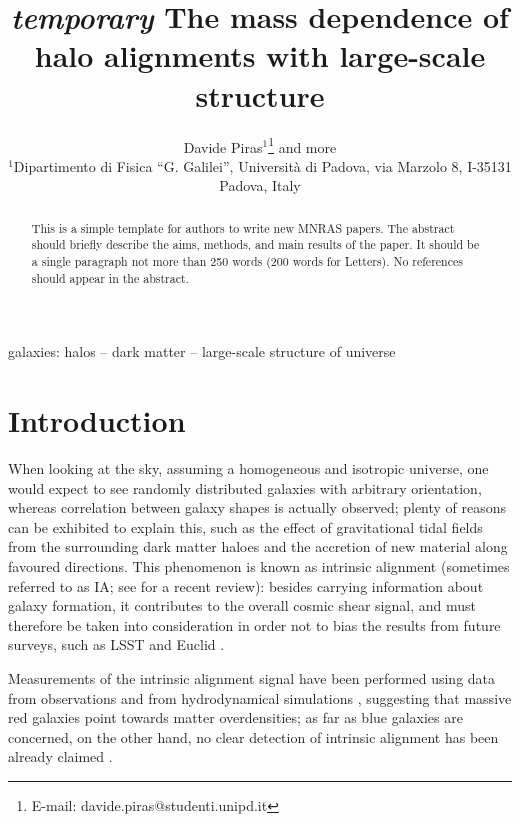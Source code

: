 \documentclass[a4paper,fleqn,usenatbib]{mnras}
\title[\textit{temporary} Slope of intrinsic alignment amplitude vs mass]{\textit{temporary} The mass dependence of halo alignments with large-scale structure}
\author[D. Piras and more]{
Davide Piras$^{1}$\thanks{E-mail: davide.piras@studenti.unipd.it}
and more
\\
$^{1}$Dipartimento di Fisica ``G. Galilei'', Universit\`{a} di Padova, via Marzolo 8, I-35131 Padova, Italy\\
}
\begin{document}
\label{firstpage}
\pagerange{\pageref{firstpage}--\pageref{lastpage}}
\maketitle

\begin{abstract}
This is a simple template for authors to write new MNRAS papers.
The abstract should briefly describe the aims, methods, and main results of the paper.
It should be a single paragraph not more than 250 words (200 words for Letters).
No references should appear in the abstract.
\end{abstract}

\begin{keywords}
galaxies: halos --  dark matter -- large-scale structure of universe 
\end{keywords}



\section{Introduction}
\label{sec:intro}
When looking at the sky, assuming a homogeneous and isotropic universe, one would expect to see randomly distributed galaxies with arbitrary orientation, whereas correlation between galaxy shapes is actually observed; plenty of reasons can be exhibited to explain this, such as the effect of gravitational tidal fields from the surrounding dark matter haloes and the accretion of new material along favoured directions. This phenomenon is known as intrinsic alignment (sometimes referred to as IA; see \citet{Joachimietal2015} for a recent review): besides carrying information about galaxy formation, it contributes to the overall cosmic shear signal, and must therefore be taken into consideration in order not to bias the results from future surveys, such as LSST \citep{LSST2009} and Euclid \citep{Euclid2011}.

Measurements of the intrinsic alignment signal have been performed using data from observations \citep{Mandelbaumetal2006, Hirataetal2007, Okumuraetal2009} and from hydrodynamical simulations \citep{Codisetal2015, Velliscigetal2015, Chisarietal2015, Hilbertetal2016, Tennetietal2016}, suggesting that massive red galaxies point towards matter overdensities; as far as blue galaxies are concerned, on the other hand, no clear detection of intrinsic alignment has been already claimed \citep{Hirataetal2007, Mandelbaumetal2011}.
\end{document}
